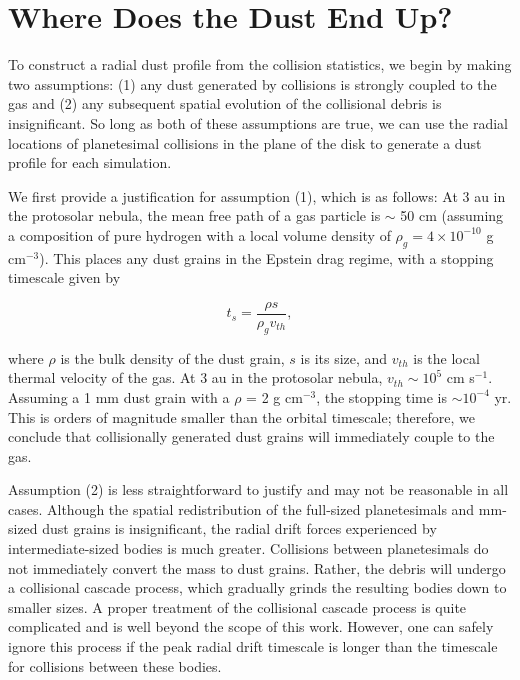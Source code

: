 \documentclass[fleqn,usenatbib]{mnras}
\begin{document}
\section{Where Does the Dust End Up?}\label{sec:dust}

To construct a radial dust profile from the collision statistics, we begin by making two assumptions: (1) any dust generated by collisions is strongly coupled to the gas and (2) any 
subsequent spatial evolution of the collisional debris is insignificant. So long as both of these assumptions are true, we can use the radial locations of planetesimal collisions in the 
plane of the disk to generate a dust profile for each simulation.

We first provide a justification for assumption (1), which is as follows: At 3 au in the protosolar nebula, the mean free path of a gas particle is $\sim$ 50 cm (assuming a composition 
of pure hydrogen with a local volume density of $\rho_{g} = 4 \times 10^{-10}$ g cm$^{-3}$). This places any dust grains in the Epstein drag regime, with a stopping timescale given by

\begin{equation}\label{eq:ts_epstein}
    t_{s} = \frac{\rho s}{\rho_{g} v_{th}},
\end{equation}

\noindent where $\rho$ is the bulk density of the dust grain, $s$ is its size, and $v_{th}$ is the local thermal velocity of the gas. At 3 au in the protosolar nebula, $v_{th} \sim 10^{5}$ cm 
s$^{-1}$. Assuming a 1 mm dust grain with a $\rho$ = 2 g cm$^{-3}$, the stopping time is $\sim 10^{-4}$ yr.  This is orders of magnitude smaller than the 
orbital timescale; therefore, we conclude that collisionally generated dust grains will immediately couple to the gas.

Assumption (2) is less straightforward to justify and may not be reasonable in all cases. Although the spatial redistribution of the full-sized planetesimals and mm-sized dust grains 
is insignificant, the radial drift forces experienced by intermediate-sized bodies is much greater. Collisions between planetesimals do not immediately convert the mass to dust grains. 
Rather, the debris will undergo a collisional cascade process, which
gradually grinds the resulting bodies down to smaller sizes. A proper
treatment of the collisional cascade process is 
quite complicated and is well beyond the scope of this work. However, one can safely ignore this process if the peak radial drift timescale is longer than the timescale for collisions 
between these bodies.
\end{document}

